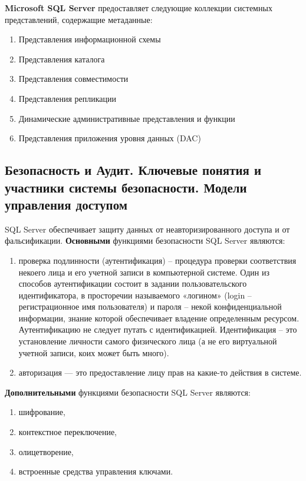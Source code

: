 \textbf{Microsoft SQL Server} предоставляет следующие коллекции системных
представлений, содержащие метаданные:

\begin{enumerate}
	\item Представления информационной схемы
	\item Представления каталога
	\item Представления совместимости
	\item Представления репликации
	\item Динамические административные представления и функции
	\item Представления приложения уровня данных (DAC)
\end{enumerate}

\newpage

\subsection{Безопасность и Аудит. Ключевые понятия и участники системы безопасности. Модели управления доступом}

SQL Server обеспечивает защиту данных от неавторизированного
доступа и от фальсификации. \textbf{Основными} функциями безопасности
SQL Server являются:

\begin{enumerate}
	\item проверка подлинности (аутентификация) – процедура проверки
	соответствия некоего лица и его учетной записи в компьютерной
	системе. Один из способов аутентификации состоит в задании
	пользовательского идентификатора, в просторечии называемого
	«логином» (login – регистрационное имя пользователя) и пароля –
	некой конфиденциальной информации, знание которой обеспечивает
	владение определенным ресурсом. Аутентификацию не следует путать с идентификацией. Идентификация – это установление личности самого физического лица (а не его виртуальной учетной записи, коих может быть много).
	\item авторизация --- это предоставление лицу прав на какие-то действия в
	системе.
\end{enumerate}


\textbf{Дополнительными} функциями безопасности SQL Server являются:

\begin{enumerate}
	\item шифрование,
	\item контекстное переключение,
	\item олицетворение,
	\item встроенные средства управления ключами.
\end{enumerate}

